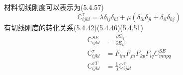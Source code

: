 \documentclass{article}
\begin{document}
材料切线刚度可以表示为\cite{bely}(5.4.57)
\begin{equation*}
    \mathbb{C}^{\tau}_{ijkl}=\lambda \delta_{ij} \delta_{kl}+\mu(\delta_{ik}\delta_{jl}+\delta_{il}\delta_{kj})
\end{equation*}
有切线刚度的转化关系\cite{bely}(5.4.42)(5.4.46)(5.4.51)
\begin{equation*}
    \begin{aligned}
        \mathbb{C}^{SE}_{ijkl}       & =\frac{\partial S_{ij}}{\partial E_{kl}} \\
        \mathbb{C}^{\tau}_{ijkl}     & =F_{im}F_{jn}F_{kp}F_{lq}C^{SE}_{mnpq}   \\
        \mathbb{C}^{\sigma T}_{ijkl} & =\frac{1}{J}\mathbb{C}^{\tau}_{ijkl}     \\
    \end{aligned}
\end{equation*}
\end{document}
